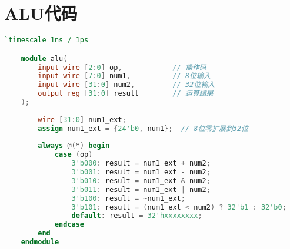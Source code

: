 \appendix
\section{ALU代码}

\begin{lstlisting}[language=Verilog]
    `timescale 1ns / 1ps

    module alu(
        input wire [2:0] op,            // 操作码
        input wire [7:0] num1,          // 8位输入
        input wire [31:0] num2,         // 32位输入
        output reg [31:0] result        // 运算结果
    );
    
        wire [31:0] num1_ext;
        assign num1_ext = {24'b0, num1};  // 8位零扩展到32位
    
        always @(*) begin
            case (op)
                3'b000: result = num1_ext + num2;
                3'b001: result = num1_ext - num2;
                3'b010: result = num1_ext & num2;
                3'b011: result = num1_ext | num2;
                3'b100: result = ~num1_ext;
                3'b101: result = (num1_ext < num2) ? 32'b1 : 32'b0;
                default: result = 32'hxxxxxxxx;
            endcase
        end
    endmodule
    
\end{lstlisting}

